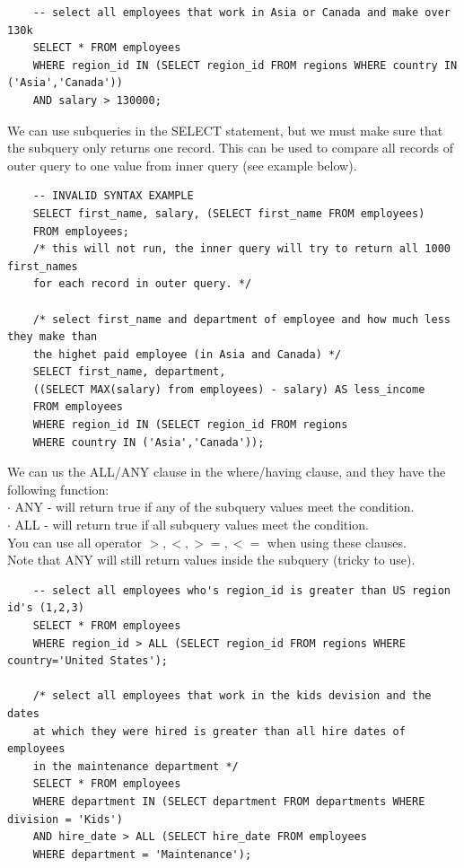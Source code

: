 \documentclass[11pt, a4paper]{article}
\begin{document}
\begin{spacing}{1.1}
\begin{lstlisting}
	-- select all employees that work in Asia or Canada and make over 130k
	SELECT * FROM employees
	WHERE region_id IN (SELECT region_id FROM regions WHERE country IN ('Asia','Canada')) 
	AND salary > 130000;\end{lstlisting} \vspace*{1mm}
	We can use subqueries in the SELECT statement, but we must make sure that the subquery only returns one record. This can be used to compare all records of outer query to one value from inner query (see example below).
	\begin{lstlisting}
	-- INVALID SYNTAX EXAMPLE
	SELECT first_name, salary, (SELECT first_name FROM employees)
	FROM employees; 
	/* this will not run, the inner query will try to return all 1000 first_names 
	for each record in outer query. */
	
	/* select first_name and department of employee and how much less they make than 
	the highet paid employee (in Asia and Canada) */
	SELECT first_name, department, 
	((SELECT MAX(salary) from employees) - salary) AS less_income
	FROM employees
	WHERE region_id IN (SELECT region_id FROM regions 
	WHERE country IN ('Asia','Canada')); \end{lstlisting} \newpage
	\noindent We can us the ALL/ANY clause in the where/having clause, and they have the following function: \\
	\hspace*{3mm} $\cdot$ ANY - will return true if any of the subquery values meet the condition. \\
	\hspace*{3mm} $\cdot$ ALL - will return true if all subquery values meet the condition. \\
	You can use all operator $>, <, >=, <=$ when using these clauses. \\
	Note that ANY will still return values inside the subquery (tricky to use).
	\begin{lstlisting}
	-- select all employees who's region_id is greater than US region id's (1,2,3)
	SELECT * FROM employees
	WHERE region_id > ALL (SELECT region_id FROM regions WHERE country='United States');
	
	/* select all employees that work in the kids devision and the dates
	at which they were hired is greater than all hire dates of employees
	in the maintenance department */
	SELECT * FROM employees
	WHERE department IN (SELECT department FROM departments WHERE division = 'Kids')
	AND hire_date > ALL (SELECT hire_date FROM employees 
	WHERE department = 'Maintenance');
	

\end{lstlisting}
\end{spacing}
\end{document}
